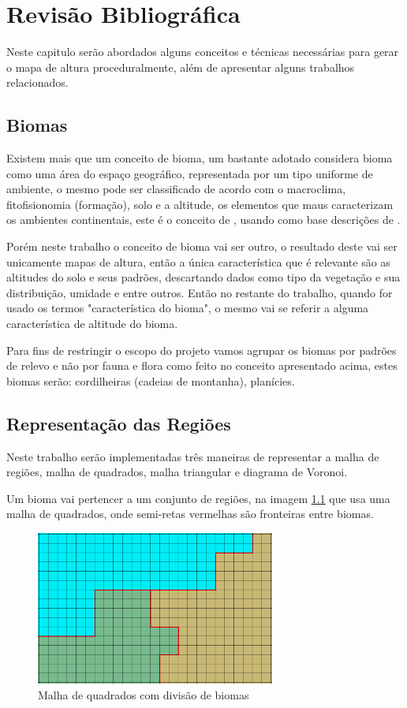 \chapter{Revisão Bibliográfica}
Neste capitulo serão abordados alguns conceitos e técnicas necessárias para
gerar o mapa de altura proceduralmente, além de apresentar alguns trabalhos
relacionados.

\section{Biomas} %
Existem mais que um conceito de bioma, um bastante adotado considera bioma como
uma área do espaço geográfico, representada por um tipo uniforme de ambiente, o
mesmo pode ser classificado de acordo com o macroclima, fitofisionomia (formação),
solo e a altitude, os elementos que maus caracterizam os ambientes continentais, 
este é o conceito de \cite{coutinho2006conceito}, usando como base descrições
de \cite{walter1986vegetaccao}.

Porém neste trabalho o conceito de bioma vai ser outro, o resultado deste
vai ser unicamente mapas de altura, então a única característica que é relevante
são as altitudes do solo e seus padrões, descartando dados como tipo da
vegetação e sua distribuição, umidade e entre outros. Então no restante 
do trabalho, quando for usado os termos "característica do bioma", o mesmo vai
se referir a alguma característica de altitude do bioma.

Para fins de restringir o escopo do projeto vamos agrupar os biomas por padrões
de relevo e não por fauna e flora como feito no conceito apresentado acima,
estes biomas serão: cordilheiras (cadeias de montanha), planícies.

\section{Representação das Regiões}
Neste trabalho serão implementadas três maneiras de representar a malha de
regiões, malha de quadrados, malha triangular e diagrama de Voronoi.

Um bioma vai pertencer a um conjunto de regiões, na imagem \ref{fig:squadStripBiomes}
que usa uma malha de quadrados, onde semi-retas vermelhas são fronteiras entre
biomas.
\begin{figure}[H]
    \centering
    \includegraphics[width=0.7\textwidth]{figuras/squadStripBiomes.png}
    \caption{Malha de quadrados com divisão de biomas}
    \label{fig:squadStripBiomes}
\end{figure}
